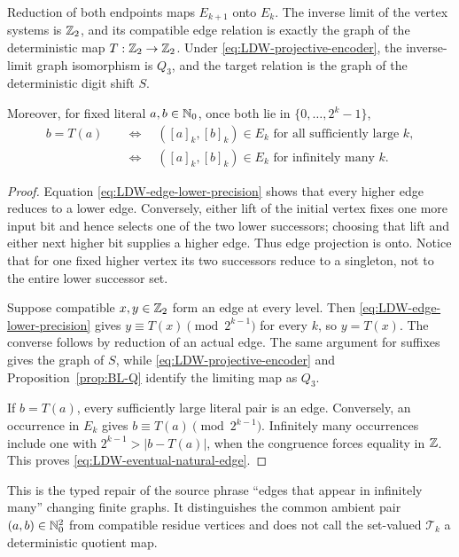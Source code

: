 \begin{proposition}
\label{prop:LDW-edge-inverse-limit}
Reduction of both endpoints maps $E_{k+1}$ onto $E_k$.  The inverse limit of
the vertex systems is $\mathbb{Z}_{2}$, and its compatible edge relation is exactly
the graph of the deterministic map $T:\mathbb{Z}_{2}\to\mathbb{Z}_{2}$.  Under
\eqref{eq:LDW-projective-encoder}, the inverse-limit graph isomorphism is
$Q_3$, and the target relation is the graph of the deterministic digit shift
$S$.

Moreover, for fixed literal $a,b\in\mathbb{N}_{0}$, once both lie in
$\{0,\ldots,2^k-1\}$,
\begin{equation}
\label{eq:LDW-eventual-natural-edge}
 \begin{aligned}
 b=T(a)
 &\quad\Longleftrightarrow\quad
 ([a]_k,[b]_k)\in E_k\text{ for all sufficiently large }k,\\
 &\quad\Longleftrightarrow\quad
 ([a]_k,[b]_k)\in E_k\text{ for infinitely many }k.
 \end{aligned}
\end{equation}
\end{proposition}

\begin{proof}
Equation \eqref{eq:LDW-edge-lower-precision} shows that every higher edge
reduces to a lower edge.  Conversely, either lift of the initial vertex fixes
one more input bit and hence selects one of the two lower successors; choosing
that lift and either next higher bit supplies a higher edge.  Thus edge
projection is onto.  Notice that for one fixed higher vertex its two
successors reduce to a singleton, not to the entire lower successor set.

Suppose compatible $x,y\in\mathbb{Z}_{2}$ form an edge at every level.  Then
\eqref{eq:LDW-edge-lower-precision} gives
$y\equiv T(x)\pmod{2^{k-1}}$ for every $k$, so $y=T(x)$.  The converse follows
by reduction of an actual edge.  The same argument for suffixes gives the
graph of $S$, while \eqref{eq:LDW-projective-encoder} and
Proposition~\ref{prop:BL-Q} identify the limiting map as $Q_3$.

If $b=T(a)$, every sufficiently large literal pair is an edge.  Conversely,
an occurrence in $E_k$ gives $b\equiv T(a)\pmod{2^{k-1}}$.  Infinitely many
occurrences include one with $2^{k-1}>|b-T(a)|$, when the congruence forces
equality in $\mathbb{Z}$.  This proves \eqref{eq:LDW-eventual-natural-edge}.
\end{proof}

This is the typed repair of the source phrase ``edges that appear in
infinitely many'' changing finite graphs.  It distinguishes the common
ambient pair $(a,b)\in\mathbb{N}_{0}^2$ from compatible residue vertices and does not
call the set-valued $\mathcal T_k$ a deterministic quotient map.

